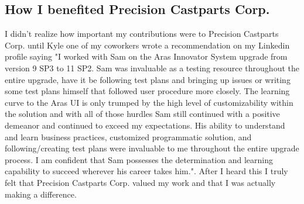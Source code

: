 \documentclass[letterpaper,10pt,notitlepage,fleqn]{article}
\begin{document}
\subsection{How I benefited Precision Castparts Corp.}
\indent I didn't realize how important my contributions were to Precision 
Castparts Corp. until Kyle one of my coworkers wrote a recommendation on my Linkedin 
profile saying "I worked with Sam on the Aras Innovator System upgrade from version 
9 SP3 to 11 SP2. Sam was invaluable as a testing resource throughout the entire 
upgrade, have it be following test plans and bringing up issues or writing some 
test plans himself that followed user procedure more closely. The learning curve 
to the Aras UI is only trumped by the high level of customizability within the 
solution and with all of those hurdles Sam still continued with a positive demeanor 
and continued to exceed my expectations. His ability to understand and learn business 
practices, customized programmatic solution, and following/creating test plans were 
invaluable to me throughout the entire upgrade process. I am confident that Sam 
possesses the determination and learning capability to succeed wherever his career 
takes him.". After I heard this I truly felt that Precision Castparts Corp. valued my work 
and that I was actually making a difference.\\ 
\end{document}

